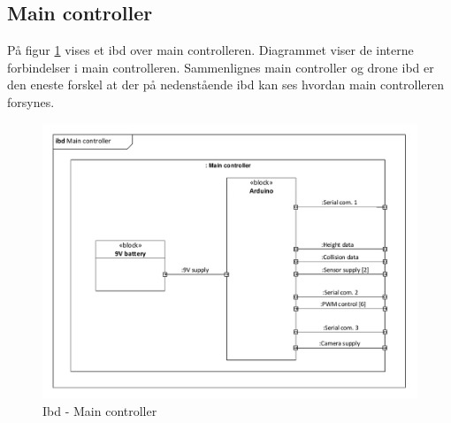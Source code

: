\subsection{Main controller}

På figur \ref{fig:ibd_maincontroller} vises et ibd over main controlleren. Diagrammet viser de interne forbindelser i main controlleren. Sammenlignes main controller og drone ibd er den eneste forskel at der på nedenstående ibd kan ses hvordan main controlleren forsynes.  

\begin{figure}[H]
\centering
\includegraphics[width=1\textwidth]{Billeder/IBD/ibd3_maincontroller.pdf}
\vspace{-1cm}
\caption{Ibd - Main controller}
\label{fig:ibd_maincontroller}
\end{figure}

